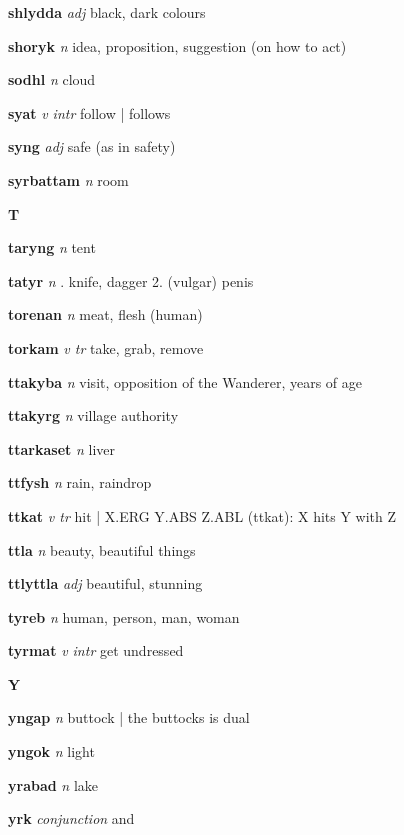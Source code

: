 \textbf{shlydda}   \emph{adj} \textperiodcentered black, dark colours

\textbf{shoryk}   \emph{n} \textperiodcentered idea, proposition, suggestion (on how to act)

\textbf{sodhl}   \emph{n} \textperiodcentered cloud

\textbf{syat}   \emph{v intr} \textperiodcentered follow | \ABS follows \DAT

\textbf{syng}   \emph{adj} \textperiodcentered safe (as in safety)

\textbf{syrbattam}   \emph{n} \textperiodcentered room

\begin{center} \Huge \bfseries T \end{center}\textbf{taryng}   \emph{n} \textperiodcentered tent

\textbf{tatyr}   \emph{n} . knife, dagger 2. (vulgar) penis 

\textbf{torenan}   \emph{n} \textperiodcentered meat, flesh (human)

\textbf{torkam}   \emph{v tr} \textperiodcentered take, grab, remove

\textbf{ttakyba}   \emph{n} \textperiodcentered visit, opposition of the Wanderer, years of age

\textbf{ttakyrg}   \emph{n} \textperiodcentered village authority

\textbf{ttarkaset}   \emph{n} \textperiodcentered liver

\textbf{ttfysh}   \emph{n} \textperiodcentered rain, raindrop

\textbf{ttkat}   \emph{v tr} \textperiodcentered hit | X.ERG Y.ABS Z.ABL (ttkat): X hits Y with Z

\textbf{ttla}   \emph{n} \textperiodcentered beauty, beautiful things

\textbf{ttlyttla}   \emph{adj} \textperiodcentered beautiful, stunning

\textbf{tyreb}   \emph{n} \textperiodcentered human, person, man, woman

\textbf{tyrmat}   \emph{v intr} \textperiodcentered get undressed

\begin{center} \Huge \bfseries Y \end{center}\textbf{yngap}   \emph{n} \textperiodcentered buttock | the buttocks is dual

\textbf{yngok}   \emph{n} \textperiodcentered light

\textbf{yrabad}   \emph{n} \textperiodcentered lake

\textbf{yrk}   \emph{conjunction} \textperiodcentered and

